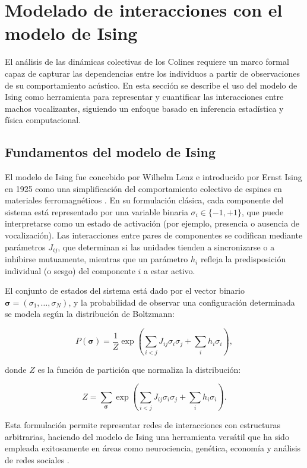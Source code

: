 \section{Modelado de interacciones con el modelo de Ising}
\label{sec:modelado_ising}



El análisis de las dinámicas colectivas de los Colines requiere un 
marco formal capaz de capturar las dependencias entre los 
individuos a partir de observaciones de su comportamiento 
acústico. En esta sección se describe el uso del modelo de 
Ising como herramienta para representar y cuantificar las 
interacciones entre machos vocalizantes, siguiendo un enfoque 
basado en inferencia estadística y física computacional.

\subsection{Fundamentos del modelo de Ising}

El modelo de Ising fue concebido por Wilhelm Lenz e introducido por Ernst Ising en 1925 como 
una simplificación del comportamiento colectivo de espines en 
materiales ferromagnéticos \cite{ising1925beitrag}. En su 
formulación clásica, cada componente del sistema está 
representado por una variable binaria \( \sigma_i \in \{-1, +1\} \), 
que puede interpretarse como un estado de activación 
(por ejemplo, presencia o ausencia de vocalización). Las 
interacciones entre pares de componentes se codifican mediante 
parámetros \( J_{ij} \), que determinan si las unidades tienden 
a sincronizarse o a inhibirse mutuamente, mientras que un 
parámetro \( h_i \) refleja la predisposición individual (o 
sesgo) del componente \( i \) a estar activo.

El conjunto de estados del sistema está dado por el vector 
binario 
\(\boldsymbol{\sigma} = (\sigma_1, \dots, \sigma_N)\), y la 
probabilidad de observar una configuración determinada se modela 
según la distribución de Boltzmann:

\[
P(\boldsymbol{\sigma}) = \frac{1}{Z} \exp\left( \sum_{i<j} J_{ij} \sigma_i \sigma_j + \sum_{i} h_i \sigma_i \right),
\]

donde \( Z \) es la función de partición que normaliza la 
distribución:

\[
Z = \sum_{\boldsymbol{\sigma}} \exp\left( \sum_{i<j} J_{ij} \sigma_i \sigma_j + \sum_i h_i \sigma_i \right).
\]

Esta formulación permite representar redes de interacciones con 
estructuras arbitrarias, haciendo del modelo de Ising una 
herramienta versátil que ha sido empleada exitosamente en áreas 
como neurociencia, genética, economía y análisis de redes 
sociales \cite{chau2017inverse}.

